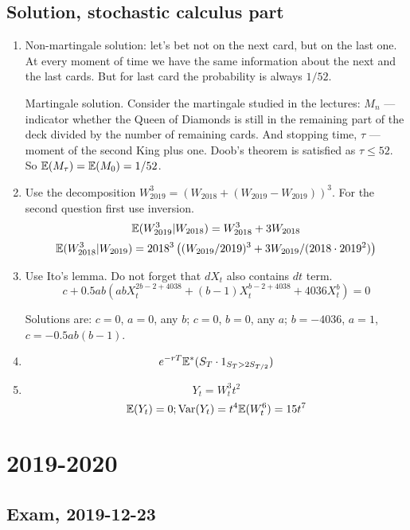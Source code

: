 \documentclass[12pt, a4paper]{article}
\begin{document}
\subsection{Solution, stochastic calculus part}

\begin{enumerate}
\item Non-martingale solution: let's bet not on the next card, but on the last one.
At every moment of time we have the same information about
the next and the last cards. But for last card the probability is always $1/52$.

Martingale solution. Consider the martingale studied in the lectures:
$M_n$ — indicator whether the Queen of Diamonds is still
in the remaining part of the deck divided
by the number of remaining cards.
And stopping time, $\tau$ — moment of the second King plus one.
Doob's theorem is satisfied as $\tau \leq 52$. So $\mathbb{E}(M_{\tau}) = \mathbb{E}(M_0)=1/52$.
\item Use the decomposition $W_{2019}^3= (W_{2018} + (W_{2019} - W_{2019}))^3$.
For the second question first use inversion.
\[
\mathbb{E}(W_{2019}^3|W_{2018}) = W_{2018}^3 + 3W_{2018}
\]
\[
\mathbb{E}(W_{2018}^3|W_{2019}) = 2018^3 \left( (W_{2019}/2019)^3 + 3 W_{2019}/(2018\cdot 2019^2) \right)
\]

\item Use Ito's lemma. Do not forget that $dX_t$ also contains $dt$ term.
\[
c + 0.5ab(ab X_t^{2b-2+4038} + (b-1)X_t^{b-2+4038} + 4036X_t^b) = 0
\]

Solutions are: $c=0$, $a=0$, any $b$; $c=0$, $b=0$, any $a$; $b=-4036$, $a=1$, $c=-0.5ab(b-1)$.
\item
\[
e^{-rT}\mathbb{E}^*(S_T \cdot 1_{S_T > 2S_{T/2}})
\]
\item
\[
Y_t = W_t^3 t^2
\]
\[
\mathbb{E}(Y_t)=0; \operatorname{Var}(Y_t) = t^4 \mathbb{E}(W_t^6) = 15 t^7
\]
\end{enumerate}


\section{2019-2020}


\subsection{Exam, 2019-12-23}
\end{document}
